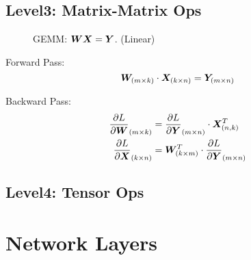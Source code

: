 \documentclass[9pt,twocolumn,times]{article}
\begin{document}
\subsection{Level3: Matrix-Matrix Ops}

\begin{figure}[h]
	\centering
	\resizebox{0.618\columnwidth}{!}{%
		
	}
	\caption{GEMM: ${\bm{W}} {\bm{X}} = {\bm{Y}}$. (Linear)}
\end{figure}

	Forward Pass:
	\begin{equation}
		{\bm{W}}_{(m\times k)} \cdot {\bm{X}}_{(k\times n)} = {\bm{Y}}_{(m\times n)}
	\end{equation}

	Backward Pass:
	\begin{align}
		\frac{\partial L}{\partial{\bm{W}}}_{(m\times k)} &=
		\frac{\partial L}{\partial{\bm{Y}}}_{(m\times n)} \cdot {\bm{X}}^T_{(n,k)}\\
		\frac{\partial L}{\partial{\bm{X}}}_{(k\times n)} &=
		{\bm{W}}^T_{(k\times m)} \cdot \frac{\partial L}{\partial {\bm{Y}}}_{(m\times n)}
	\end{align}

\subsection{Level4: Tensor Ops}

\section{Network Layers}
\end{document}
